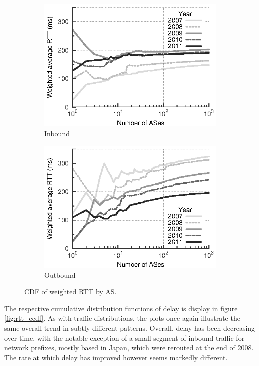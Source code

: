 \begin{figure}
    \centering
    \begin{subfigure}[b]{0.5\linewidth}
        \includegraphics{figures/malawi/rtt_wcdf_in}
        \caption{Inbound}
    \end{subfigure}%
    \begin{subfigure}[b]{0.5\linewidth}
        \includegraphics{figures/malawi/rtt_wcdf_out}
        \caption{Outbound}
    \end{subfigure}%
    \caption{CDF of weighted RTT by AS. \label{fig:rtt_wcdf}}
\end{figure}

The respective cumulative distribution functions of delay is display in figure \ref{fig:rtt_ecdf}. As with traffic distributions, the plots once again illustrate the same overall trend in subtly different patterns. Overall, delay has been decreasing over time, with the notable exception of a small segment of inbound traffic for network prefixes, mostly based in Japan, which were rerouted at the end of 2008. The rate at which delay has improved however seems markedly different. 

